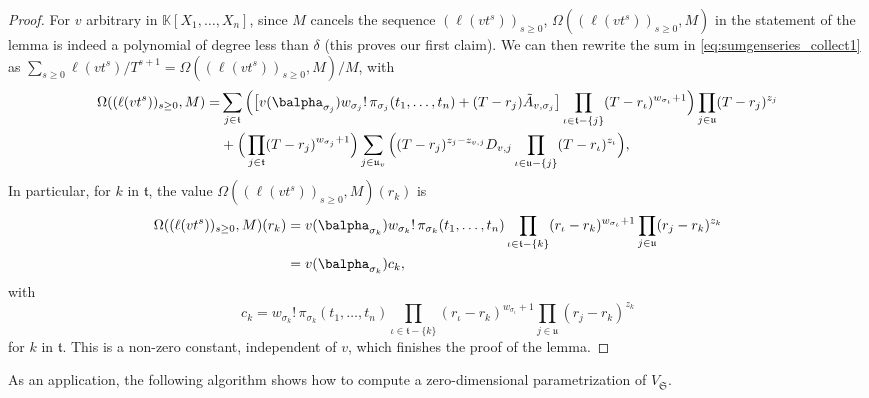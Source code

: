 \documentclass[12pt]{article}
\def\K{\mathbb{K}}
\def\K {\ensuremath{\mathbb{K}}}
\begin{document}
\begin{proof}
	For $v$ arbitrary in $\K[X_1,\dots,X_n]$, since  $M$ cancels the sequence
	$(\ell(v t^s))_{s \ge 0}$, $\Omega((\ell(v t^s))_{s \ge 0} ,M)$ in the statement of
	the lemma is indeed a polynomial of degree less than $\delta$ (this
	proves our first claim). We can then rewrite the
	sum in \cref{eq:sumgenseries_collect1} as $ \sum_{s \ge 0} \ell(v
	t^s)/T^{s+1} =\Omega((\ell(v t^s))_{s \ge 0} ,M)/M$, with
	\begin{align*}
	\Omega((\ell(v t^s))_{s \ge 0} ,M)=&\sum_{j \in \mathfrak{t}} \Big(\big[
	v(\balpha_{\sigma_{j}})  w_{\sigma_j}!\, \pi_{\sigma_j}(t_1,\dots,t_n)
	+ (T-r_j)\tilde A_{v,\sigma_j}\big]
	\prod_{\iota \in \mathfrak{t}-\{j\}}(T-r_{\iota} )^{w_{\sigma_{\iota}}+1}
	\Big)\prod_{j \in \mathfrak{u}}(T-r_j )^{z_j}
	\\
	&+
	\Big(\prod_{j \in \mathfrak{t}}(T-r_{j} )^{w_{\sigma_j}+1}\Big)
	\sum_{j \in \mathfrak{u}_v} \Big (
	(T-r_j)^{z_{j}-z_{v,j}} D_{v,j}
	\prod_{\iota \in \mathfrak{u}-\{j\}}(T-r_{\iota} )^{z_{\iota}}\Big),
	\end{align*}
	In particular, 
	for $k$ in $\mathfrak{t}$,
	the value $\Omega((\ell(v t^s))_{s \ge 0} ,M)(r_k)$ is 
	\begin{align*}
	\Omega((\ell(v t^s))_{s \ge 0} ,M)(r_k)&= v(\balpha_{\sigma_{k}}) w_{\sigma_k}!\, \pi_{\sigma_k}(t_1,\dots,t_n)
	\prod_{\iota \in \mathfrak{t}-\{k\}}(r_\iota-r_{k} )^{w_{\sigma_{\iota}}+1}
	\prod_{j \in \mathfrak{u}}(r_j-r_{k} )^{z_{k}}\\
	&= v(\balpha_{\sigma_{k}}) c_{k},
	\end{align*}
	with 
	$$c_{k}=
	w_{\sigma_k}!\, \pi_{\sigma_k}(t_1,\dots,t_n)
	\prod_{\iota \in \mathfrak{t}-\{k\}}(r_\iota-r_{k} )^{w_{\sigma_{\iota}}+1}
	\prod_{j \in \mathfrak{u}}(r_j-r_{k} )^{z_{k}}$$
	for $k$ in $\mathfrak{t}$. This is a non-zero constant, independent 
	of $v$, which finishes the proof of the lemma.
\end{proof}

As an application, the following algorithm shows how to compute a
zero-dimensional parametrization of $V_{\mathfrak{S}}$.
\end{document}
